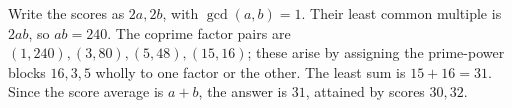 Write the scores as $2a,2b$, with $\gcd(a,b)=1$. Their least common multiple is $2ab$, so $ab=240$. The coprime factor pairs are $(1,240),(3,80),(5,48),(15,16)$; these arise by assigning the prime-power blocks $16,3,5$ wholly to one factor or the other. The least sum is $15+16=31$. Since the score average is $a+b$, the answer is $\boxed{31}$, attained by scores $30,32$.
